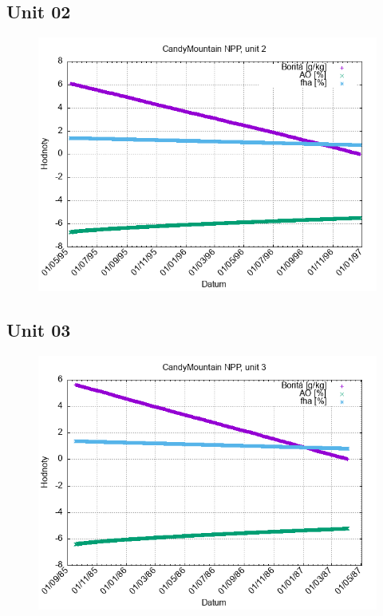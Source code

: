 \documentclass{article}
\begin{document}
\subsection*{Unit 02}
\begin{figure}[h!]
\centering
\includegraphics[width=14cm]{./grafy/CandyMountain02.png}
\end{figure}
\clearpage
\subsection*{Unit 03}
\begin{figure}[h!]
\centering
\includegraphics[width=14cm]{./grafy/CandyMountain03.png}
\end{figure}
\clearpage
\end{document}
